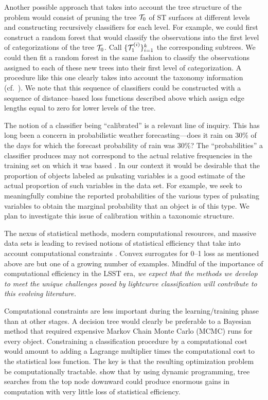 Another possible approach that takes into account the tree structure of the
problem would consist of pruning the tree ${\cal T}_0$ of ST surfaces at
different levels and constructing recursively classifiers for each level.  For
example, we could first construct a random forest that would classify the
observations into the first level of categorizations of the tree ${\cal T}_0$.
Call $\{{\cal T}_1^{(i)}\}_{i=1}^k$ the corresponding subtrees. We could then
fit a random forest in the same fashion to classify the observations assigned to
each of these new trees into their first level of categorization. A procedure
like this one clearly takes into account the taxonomy information (cf.\
\citealt{CesaBianchi06}).  We note that this sequence of classifiers could be
constructed with a sequence of distance--based loss functions described above
which assign edge lengths equal to zero for lower levels of the tree.

The notion of a classifier being ``calibrated'' is a relevant line of inquiry.
This has long been a concern in probabilistic weather forecasting---does it rain
on 30\% of the days for which the forecast probability of rain was 30\%?  The
``probabilities'' a classifier produces may not correspond to the actual
relative frequencies in the training set on which it was based
\citep{niculescu05:obtaining}.  In our context it would be desirable that the
proportion of objects labeled as pulsating variables is a good estimate of the
actual proportion of such variables in the data set.  For example, we seek  to
meaningfully combine  the reported probabilities of the various types of
pulsating variables to obtain the marginal probability that an object is of this
type.  We plan to investigate this issue of calibration within a taxonomic
structure.

The nexus of statistical methods, modern computational resources, and massive
data sets is leading to revised notions of statistical efficiency that take into
account computational constraints \citep{MeinBickRice2008}.  Convex surrogates
for 0--1 loss as mentioned above are but one of a growing number of examples.
Mindful of the importance of computational efficiency in the LSST era, {\it we
expect that the methods we develop to meet the unique challenges posed by
lightcurve classification will contribute to this evolving literature.}

Computational constraints are less important during the learning/training phase
than at other stages.  A decision tree would clearly be preferable to a Bayesian
method that required expensive Markov Chain Monte Carlo (MCMC) runs for every
object. Constraining a classification procedure by a computational cost would
amount to adding a Lagrange multiplier times the computational cost to the
statistical loss function.  The key is that the resulting optimization problem
be computationally tractable.   \citet{MeinBickRice2008} show that by using
dynamic programming,  tree searches from the top node downward  could produce
enormous gains in computation with very little loss of statistical efficiency.

